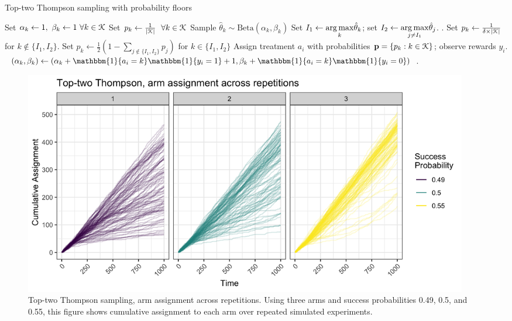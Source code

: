 \documentclass[letterpaper, 12pt, parskip=full,DIV=10]{scrartcl}
\begin{document}
\begin{algorithm} \footnotesize
    \caption{Top-two Thompson sampling with probability floors}
    \label{algg:ttts}
    \begin{algorithmic}[1] %
    	\State Set  $\alpha_{k} \leftarrow 1, \ \beta_{k} \leftarrow 1\ \forall k \in {\EuScript K}$%
			 \State Set $p_{k} \leftarrow \frac{1 }{|{\EuScript K}| } \ \ \forall k \in {\EuScript K} $ 
		\Else 	
				\State Sample $\hat \theta_k  \sim \textrm{Beta}\left(\alpha_{k}, \beta_{k} \right)$ 
			 \EndFor
			\State Set $I_1 \leftarrow \underset{k}{\operatorname*{arg\,max}} \hat\theta_k$; set $I_2 \leftarrow \underset{j\neq I_1}{\operatorname*{arg\,max}} \hat\theta_j$. . 
			\State Set $p_k \leftarrow \frac{1 }{\delta \times |{\EuScript K}| } $ for $k \notin \{ I_1, I_2\} $. 
			\State Set $p_k \leftarrow \frac{1}{2} (1-  \sum\limits_{j \notin \{ I_1, I_2\} } p_j) $ for $k \in \{ I_1, I_2\} $ 
		\EndIf
		\State Assign treatment $a_i$ with probabilities $\mathbf{p} = \{ p_k: k \in {\EuScript K} \} $; observe rewards $y_i$.
		 
			\State $(\alpha_{k}, \beta_{k}) \leftarrow (\alpha_{k} + \mathbbm{1}\{ a_i = k\}\mathbbm{1}\{ y_i = 1\} + 1,  \beta_{k} + \mathbbm{1} \{ a_i = k\}\mathbbm{1}\{ y_i = 0\})$. 
		\EndFor	
	\EndFor
    \end{algorithmic}
\end{algorithm}

\begin{figure}[htbp]
   \centering
   \includegraphics[width = 0.95\textwidth]{../../tables-figures/tt_cumulative.png}
   \caption{Top-two Thompson sampling, arm assignment across repetitions. Using three arms and success probabilities 0.49, 0.5, and 0.55, this figure shows cumulative assignment to each arm over repeated simulated experiments. }
   \label{fig:ttt_cumulative}
\end{figure}
\end{document}
